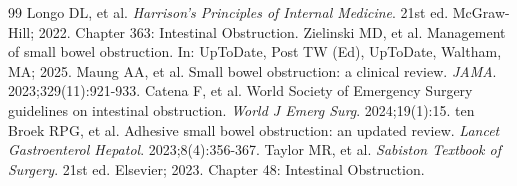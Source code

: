 \begin{thebibliography}{99}
 Longo DL, et al. \emph{Harrison's Principles of Internal Medicine}. 21st ed. McGraw-Hill; 2022. Chapter 363: Intestinal Obstruction.
 Zielinski MD, et al. Management of small bowel obstruction. In: UpToDate, Post TW (Ed), UpToDate, Waltham, MA; 2025.
 Maung AA, et al. Small bowel obstruction: a clinical review. \emph{JAMA}. 2023;329(11):921-933.
 Catena F, et al. World Society of Emergency Surgery guidelines on intestinal obstruction. \emph{World J Emerg Surg}. 2024;19(1):15.
 ten Broek RPG, et al. Adhesive small bowel obstruction: an updated review. \emph{Lancet Gastroenterol Hepatol}. 2023;8(4):356-367.
 Taylor MR, et al. \emph{Sabiston Textbook of Surgery}. 21st ed. Elsevier; 2023. Chapter 48: Intestinal Obstruction.
\end{thebibliography}
